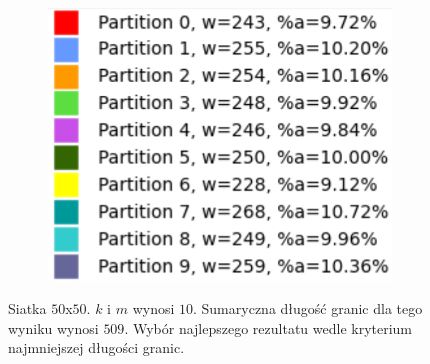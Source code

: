 \begin{figure}[h]
\begin{subfigure}{.33\textwidth}
\end{subfigure}
\begin{subfigure}{.33\textwidth}
    \centering
    \includegraphics[width=0.9\linewidth]{images/results/m/3/results}
    \caption[short]{}
\end{subfigure}
\caption{Siatka $50$x$50$. $k$ i $m$ wynosi $10$.
Sumaryczna długość granic dla tego wyniku wynosi $509$.
Wybór najlepszego rezultatu wedle kryterium najmniejszej długości granic.}
\label{result:m:3}
\end{figure}
